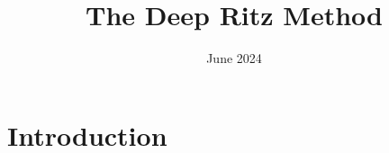 \documentclass[licencjacka, en]{pracamgr}
\title{The Deep Ritz Method }
\date{June 2024}
\begin{document}
\newcommand{\rozdzial}[2]{
	\chapter{#1}
	\label{chap:#2}
	
}

\maketitle

\begin{abstract}
\end{abstract}

\tableofcontents

\rozdzial{Introduction}{introduction}

\end{document}
